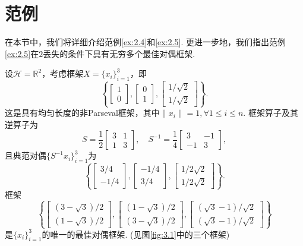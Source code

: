 \documentclass[cn,11pt,a4paper,founder]{elegantpaper}
\newcommand{\calH}{\mathcal{H}}
\newcommand{\bbR}{\mathbb{R}}
\begin{document}
\section{范例}\label{sec:3}
在本节中，我们将详细介绍范例\ref{ex:2.4}和\ref{ex:2.5}. 更进一步地，我们指出范例\ref{ex:2.5}在\(2\)丢失的条件下具有无穷多个最佳对偶框架.

\begin{example}[具有非典范最佳对偶框架的例子]
设\(\calH=\bbR^2\)，考虑框架\(X=\{x_i\}_{i=1}^3\)，即
\[
	\left\{\begin{bmatrix}
	1\\
	0
	\end{bmatrix},
	\begin{bmatrix}
	0\\
	1
	\end{bmatrix},
	\begin{bmatrix}
	1/\sqrt{2}\\
	1/\sqrt{2}
	\end{bmatrix}\right\}.
\]
这是具有均匀长度的非Parseval框架，其中\(\|x_i\|=1,\forall 1\leqslant i\leqslant n\). 框架算子及其逆算子为
\[
	S=\frac{1}{2}\begin{bmatrix}
	3&1\\
	1&3
	\end{bmatrix},
	\quad
	S^{-1}=\frac{1}{4}\begin{bmatrix}
	3&-1\\
	-1&3
	\end{bmatrix},
\]
且典范对偶\(\{S^{-1}x_i\}_{i=1}^3\)为
\[
	\left\{\begin{bmatrix}
	3/4\\
	-1/4
	\end{bmatrix},
	\begin{bmatrix}
	-1/4\\
	3/4
	\end{bmatrix},
	\begin{bmatrix}
	1/2\sqrt{2}\\
	1/2\sqrt{2}
	\end{bmatrix}\right\}.
\]
框架
\[
	\left\{\begin{bmatrix}
	(3-\sqrt{3})/2\\[2pt]
	(1-\sqrt{3})/2
	\end{bmatrix},
	\begin{bmatrix}
	(1-\sqrt{3})/2\\[2pt]
	(3-\sqrt{3})/2
	\end{bmatrix},
	\begin{bmatrix}
	(\sqrt{3}-1)/\sqrt{2}\\[2pt]
	(\sqrt{3}-1)/\sqrt{2}
	\end{bmatrix}\right\}
\]
是\(\{x_i\}_{i=1}^3\)的唯一的最佳对偶框架. (见图\ref{fig:3.1}中的三个框架)
\end{example}
\end{document}
